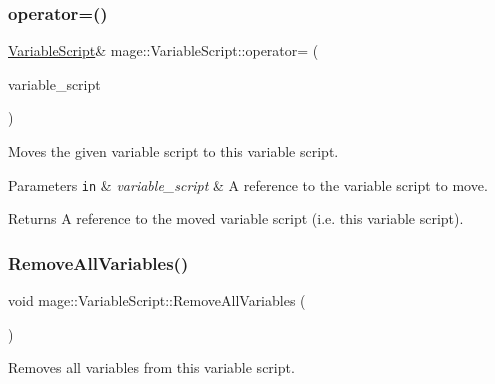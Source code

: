 \subsubsection{\texorpdfstring{operator=()}{operator=()}\hspace{0.1cm}{\footnotesize\ttfamily [2/2]}}
{\footnotesize\ttfamily \hyperlink{classmage_1_1_variable_script}{Variable\+Script}\& mage\+::\+Variable\+Script\+::operator= (\begin{DoxyParamCaption}\item[{\hyperlink{classmage_1_1_variable_script}{Variable\+Script} \&\&}]{variable\+\_\+script }\end{DoxyParamCaption})\hspace{0.3cm}{\ttfamily [delete]}}

Moves the given variable script to this variable script.


\begin{DoxyParams}[1]{Parameters}
\mbox{\tt in}  & {\em variable\+\_\+script} & A reference to the variable script to move. \\
\hline
\end{DoxyParams}
\begin{DoxyReturn}{Returns}
A reference to the moved variable script (i.\+e. this variable script). 
\end{DoxyReturn}
\hypertarget{classmage_1_1_variable_script_af83059a4ce77ebd1ae042707d0acf750}{}\label{classmage_1_1_variable_script_af83059a4ce77ebd1ae042707d0acf750} 
\subsubsection{\texorpdfstring{Remove\+All\+Variables()}{RemoveAllVariables()}}
{\footnotesize\ttfamily void mage\+::\+Variable\+Script\+::\+Remove\+All\+Variables (\begin{DoxyParamCaption}{ }\end{DoxyParamCaption})\hspace{0.3cm}{\ttfamily [noexcept]}}

Removes all variables from this variable script. \hypertarget{classmage_1_1_variable_script_a4970ef4faafb1a6a43c4648ec9f36cce}{}\label{classmage_1_1_variable_script_a4970ef4faafb1a6a43c4648ec9f36cce} 
